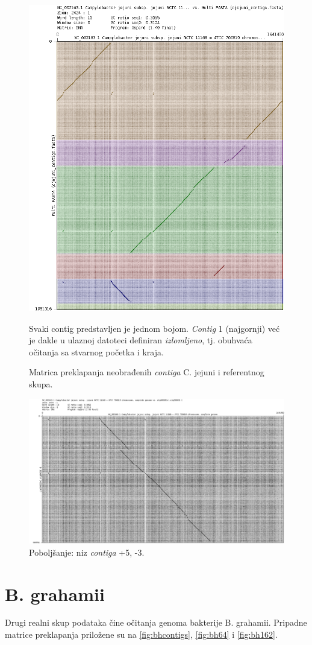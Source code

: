 \documentclass[times, utf8, seminar, numeric]{fer}
\begin{document}
\begin{figure}[h]
	\centering
	\centerline{\includegraphics[width=0.7\linewidth]{img/cj_contigs}}
	\caption{Matrica preklapanja neobrađenih \textit{contiga} C. jejuni i referentnog skupa.}
	\label{fig:cjcontigs}
	\small
	Svaki contig predstavljen je jednom bojom. \textit{Contig} 1 (najgornji) već je dakle u ulaznoj datoteci definiran \textit{izlomljeno}, tj. obuhvaća očitanja sa stvarnog početka i kraja.
\end{figure}

\begin{figure}[h]
	\centering
	\centerline{\includegraphics[width=0.7\linewidth]{img/cj_5_3}}
	\caption{Poboljšanje: niz \textit{contiga} +5, -3.}
	\label{fig:cj53}
\end{figure}


\section{B. grahamii}
Drugi realni skup podataka čine očitanja genoma bakterije B. grahamii. Pripadne matrice preklapanja priložene su na \ref{fig:bhcontigs}, \ref{fig:bh64} i \ref{fig:bh162}.
\end{document}
